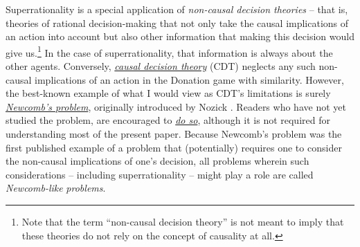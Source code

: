 Superrationality is a special application of \emph{non-causal decision
theories} -- that is, theories of rational decision-making that not only
take the causal implications of an action into account but also other
information that making this decision would give us.\footnote{Note
  that the term ``non-causal decision theory'' is not meant to imply
  that these theories do not rely on the concept of causality at all.}
In the case of superrationality, that information is always about the
other agents. Conversely,
\href{https://en.wikipedia.org/wiki/Causal_decision_theory}{\emph{causal
decision theory}} (CDT)
\parencite{Weirich2016-gq,Joyce1999-iv,Lewis1981-ct,Skyrms1982-mi,Gibbard1978-nw}
neglects any such non-causal implications of an action in the Donation
game with similarity. However, the best-known example of what I would
view as CDT's limitations is surely
\href{https://en.wikipedia.org/wiki/Newcomb\%27s_paradox}{\emph{Newcomb's
problem}}, originally introduced by Nozick 
\parencite{Nozick1969-op}. Readers who have not yet studied
the problem, are encouraged to
\href{http://lesswrong.com/lw/nc/newcombs_problem_and_regret_of_rationality/}{\emph{do
so}}, although it is not required for understanding most of the present
paper. Because Newcomb's problem was the first published example of a
problem that (potentially) requires one to consider the non-causal
implications of one's decision, all problems wherein such considerations
-- including superrationality -- might play a role are called
\emph{Newcomb-like} \emph{problems}.

